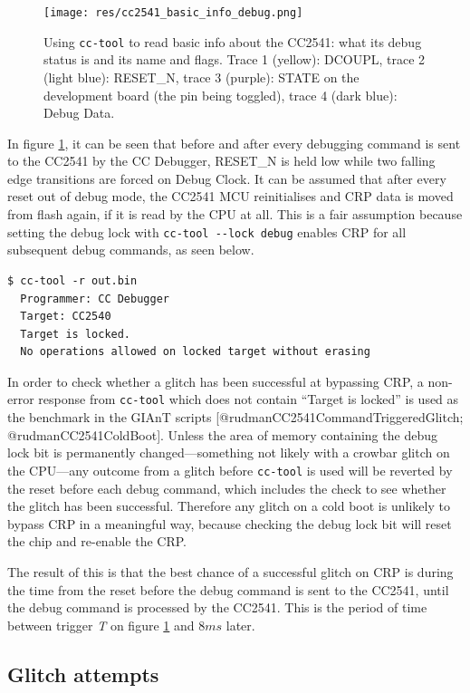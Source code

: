 \begin{figure}
\centering
\texttt{[image: res/cc2541\_basic\_info\_debug.png]}
\caption{Using \texttt{cc-tool} to read basic info about the CC2541:
what its debug status is and its name and flags. Trace 1 (yellow):
DCOUPL, trace 2 (light blue): RESET\_N, trace 3 (purple): STATE on the
development board (the pin being toggled), trace 4 (dark blue): Debug
Data. \label{img_cc2541_debugging}}
\end{figure}

In figure \ref{img_cc2541_debugging}, it can be seen that before and
after every debugging command is sent to the CC2541 by the CC Debugger,
RESET\_N is held low while two falling edge transitions are forced on
Debug Clock. It can be assumed that after every reset out of debug mode,
the CC2541 MCU reinitialises and CRP data is moved from flash again, if
it is read by the CPU at all. This is a fair assumption because setting
the debug lock with \texttt{cc-tool\ -\/-lock\ debug} enables CRP for
all subsequent debug commands, as seen below.

\begin{verbatim}
$ cc-tool -r out.bin
  Programmer: CC Debugger
  Target: CC2540
  Target is locked.
  No operations allowed on locked target without erasing
\end{verbatim}

In order to check whether a glitch has been successful at bypassing CRP,
a non-error response from \texttt{cc-tool} which does not contain
``Target is locked'' is used as the benchmark in the GIAnT scripts
{[}@rudmanCC2541CommandTriggeredGlitch; @rudmanCC2541ColdBoot{]}. Unless
the area of memory containing the debug lock bit is permanently
changed---something not likely with a crowbar glitch on the CPU---any
outcome from a glitch before \texttt{cc-tool} is used will be reverted
by the reset before each debug command, which includes the check to see
whether the glitch has been successful. Therefore any glitch on a cold
boot is unlikely to bypass CRP in a meaningful way, because checking the
debug lock bit will reset the chip and re-enable the CRP.

The result of this is that the best chance of a successful glitch on CRP
is during the time from the reset before the debug command is sent to
the CC2541, until the debug command is processed by the CC2541. This is
the period of time between trigger \emph{T} on figure
\ref{img_cc2541_debugging} and \(8ms\) later.

\hypertarget{glitch-attempts}{%
\subsection{\texorpdfstring{Glitch
attempts\label{section_cc2541_glitch_attempts}}{Glitch attempts}}\label{glitch-attempts}}

